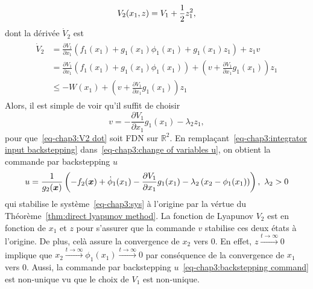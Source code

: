 \begin{equation}\label{eq-chap3:V2}
	V_2(x_1,z)=V_1 + \frac{1}{2} z_1^2,
\end{equation}	
dont la dérivée $\dot{V}_2$ est 
\begin{align}\label{eq-chap3:V2 dot}
	\begin{split}
		\dot{V}_2 &= \frac{\partial V_1}{\partial x_1}\left(f_1(x_1) + g_1(x_1)\phi_1(x_1) + g_1(x_1)z_1\right) + z_1v \\ 
		&= \frac{\partial V_1}{\partial x_1}\left(f_1(x_1) + g_1(x_1)\phi_1(x_1)\right) + \left(v + \frac{\partial V_1}{\partial x_1}g_1(x_1)\right)z_1 \\
		&\leq -W(x_1) + \left(v + \frac{\partial V_1}{\partial x_1}g_1(x_1)\right)z_1
	\end{split}
\end{align}
Alors, il est simple de voir qu'il suffit de choisir 
\begin{equation}\label{eq-chap3:integrator input backstepping}
	v= -\frac{\partial V_1}{\partial x_1}g_1(x_1) - \lambda_2z_1,
\end{equation}
pour que~\eqref{eq-chap3:V2 dot} soit FDN sur $\mathbb{R}^2$. En remplaçant~\eqref{eq-chap3:integrator input backstepping}
 dans~\eqref{eq-chap3:change of variables u}, on obtient la commande par backstepping $u$ 
\begin{equation}\label{eq-chap3:backstepping command}
	u = \frac{1}{g_2(\bm{x})}\left(-f_2(\bm{x}) +\dot{\phi}_1(x_1) -\frac{\partial V_1}{\partial x_1}g_1(x_1) - \lambda_2\left(x_2-\phi_1(x_1)\right)\right), \ \lambda_2>0
\end{equation}
qui stabilise le système~\eqref{eq-chap3:sys} à l'origine par la vértue du Théorème~\ref{thm:direct lyapunov method}. 
La fonction de Lyapunov $V_2$ est en fonction de $x_1$ et $z$ pour s'assurer que la commande $v$ stabilise ces deux états à l'origine. De plus, celà assure la convergence de $x_2$ vers 0. En effet, $z\overset{t\rightarrow\infty}{\longrightarrow}0$ implique que $ x_2\overset{t\rightarrow\infty}{\longrightarrow}\phi_1(x_1)\overset{t\rightarrow\infty}{\longrightarrow}0$ par conséquence de la convergence de $x_1$ vers 0. 
Aussi, la commande par backstepping $u$~\eqref{eq-chap3:backstepping command} est non-unique vu que le choix de $V_1$ est non-unique. 

